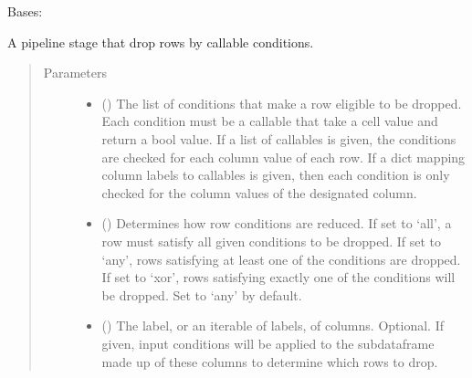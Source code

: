 \documentclass[letterpaper,10pt,english]{sphinxmanual}
\begin{document}
\begin{fulllineitems}
\label{\detokenize{dalio.pipe:dalio.pipe.select.RowDrop}}
Bases: 

A pipeline stage that drop rows by callable conditions.
\begin{quote}\begin{description}
\item[{Parameters}] \leavevmode\begin{itemize}
\item {} 
 () \textendash{} The list of conditions that make a row eligible to be dropped. Each
condition must be a callable that take a cell value and return a bool
value. If a list of callables is given, the conditions are checked for
each column value of each row. If a dict mapping column labels to
callables is given, then each condition is only checked for the column
values of the designated column.

\item {} 
 (\sphinxstyleliteralemphasis{\sphinxupquote{, }}\sphinxstyleliteralemphasis{\sphinxupquote{, }}) \textendash{} Determines how row conditions are reduced. If set to ‘all’, a row must
satisfy all given conditions to be dropped. If set to ‘any’, rows
satisfying at least one of the conditions are dropped. If set to ‘xor’,
rows satisfying exactly one of the conditions will be dropped. Set to
‘any’ by default.

\item {} 
 (\sphinxstyleliteralemphasis{\sphinxupquote{, }}) \textendash{} The label, or an iterable of labels, of columns. Optional. If given,
input conditions will be applied to the sub\sphinxhyphen{}dataframe made up of
these columns to determine which rows to drop.


\end{itemize}
\end{description}
\end{quote}
\end{fulllineitems}
\end{document}
